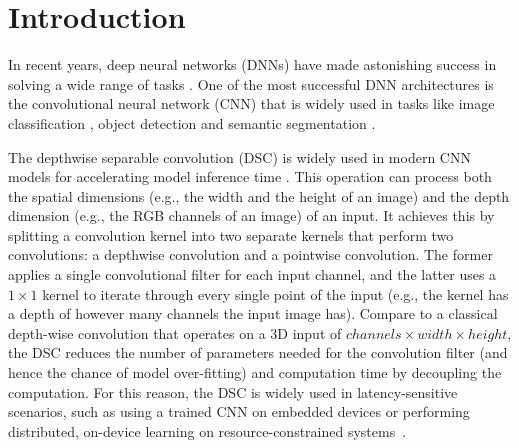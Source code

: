 \section{Introduction}

In recent years, deep neural networks (DNNs) have made astonishing success in solving a wide range of tasks \FIXME{\cite{}}. One of the
most successful DNN architectures is the convolutional neural network (CNN) that is widely used in tasks like image classification
\FIXME{\cite{}}, object detection \FIXME{\cite{}} and  semantic segmentation \FIXME{\cite{}}.


The depthwise separable convolution (DSC) is widely used in modern CNN models for accelerating model inference time \FIXME{\cite{}}. This
operation can process both the spatial dimensions (e.g., the width and the height of an image) and the depth dimension (e.g., the RGB
channels of an image) of an input. It achieves this by splitting a convolution kernel into two separate kernels that perform two
convolutions: a depthwise convolution and a pointwise convolution. The former applies a single convolutional filter for each input channel,
and the latter uses a $1 \times 1$ kernel to iterate through every single point of the input (e.g., the kernel has a depth of however many
channels the input image has). Compare to a classical depth-wise convolution that operates on a 3D input of $channels \times width \times
height$, the DSC reduces the number of parameters needed for the convolution filter (and hence the chance of model over-fitting) and
computation time by decoupling the computation. For this reason, the DSC is widely used in latency-sensitive scenarios, such as using a
trained CNN on embedded devices or performing distributed, on-device learning on resource-constrained systems~\cite{espeholt2019seed}.


